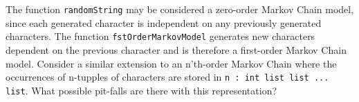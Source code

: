 The function \lstinline{randomString} may be considered a zero-order
Markov Chain model, since each generated character is independent on
any previously generated characters. The function
\lstinline{fstOrderMarkovModel} generates new characters dependent on
the previous character and is therefore a first-order Markov Chain
model. Consider a similar extension to an n'th-order Markov Chain
where the occurrences of n-tupples of characters are stored in
\lstinline{n : int list list ... list}. What possible pit-falls are
there with this representation?